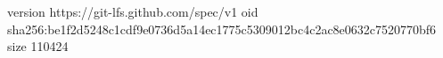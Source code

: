 version https://git-lfs.github.com/spec/v1
oid sha256:be1f2d5248c1cdf9e0736d5a14ec1775c5309012bc4c2ac8e0632c7520770bf6
size 110424
